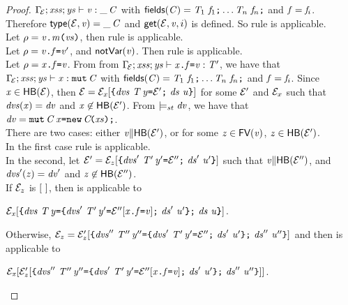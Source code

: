 {\begin{proof}
$\Gamma_{\!{\cal{E}}};\mathit{xss};\mathit{ys}\vdash {{\mathit{v}}}:\_\,\mathit{C}$ with 
$\textsf{fields}(\mathit{C})=\mathit{T}_1\ \mathit{f}_1\texttt{;}\ldots\mathit{T}_n\ \mathit{f}_n\texttt{;}$ and $\mathit{f}=\mathit{f}_i$.
Therefore $\textsf{type}({\cal{E}},\mathit{v})=\_\,\mathit{C}$ and $\textsf{get}({\cal{E}},\mathit{v},i)$ 
is defined. So rule 
is applicable.\\
Let \underline{${\rho}={\mathit{v}}\texttt{.}\mathit{m}\texttt{(}{\mathit{vs}}\texttt{)}$}, then rule 
is applicable.\\
Let \underline{${\rho}=\mathit{v}\texttt{.}\mathit{f}\texttt{=}\mathit{v}'$}, and ${\textsf{notVar}}(\mathit{v})$. Then rule  is applicable.\\
Let \underline{${\rho}=\mathit{x}\texttt{.}\mathit{f}\texttt{=}\mathit{v}$}. From from ${\Gamma_{\!{\cal{E}}}};\mathit{xss};\mathit{ys}\vdash {\mathit{x}\texttt{.}\mathit{f}\texttt{=}\mathit{v}}:\mathit{T}'$, we have that
${\Gamma_{\!{\cal{E}}}};\mathit{xss};\mathit{ys}\vdash \mathit{x}:\texttt{mut}\,\mathit{C}$ with
$\textsf{fields}(\mathit{C})=\mathit{T}_1\ \mathit{f}_1\texttt{;}\ldots\mathit{T}_n\ \mathit{f}_n\texttt{;}$ and $\mathit{f}=\mathit{f}_i$. Since $\mathit{x}\in\textsf{HB}({\cal{E}})$, 
then $\ctx=\DecEvCtx{\ctx}{\x}[\Block{\dvs\ \Dec{\T}{\y}{\ctxP}\ \decs}{\valPrime}]$ for some ${\cal{E}'}$ and ${\cal{E}}_x$ such that
$\mathit{dvs}(\mathit{x})=\mathit{dv}$ and $\mathit{x}\not\in\textsf{HB}({\cal{E}'})$. From $\models_{st}\mathit{dv}$, we have that $\mathit{dv}=\texttt{mut}\,\mathit{C}\,\mathit{x}\texttt{=}\texttt{new}\,\mathit{C}\!\texttt{(}{\mathit{xs}}\texttt{)}\texttt{;}$.\\
There are two cases: either $\mathit{v}{\parallel}\textsf{HB}({\cal{E}'})$, or for some $\mathit{z}\in\textsf{FV}(\mathit{v})$, $\mathit{z}\in\textsf{HB}({\cal{E}'})$.\\
In the first case rule  is applicable. \\
In the second, let $\ctxP={\ctx_z}[\Block{\dvs'\ \Dec{\T'}{\y'}{\ctx''}\ \decs'}{\valPrime'} ]$
such that $\mathit{v}{\parallel}\textsf{HB}({\cal{E}}'')$, and $\mathit{dvs}'(\mathit{z})=\mathit{dv}'$ and $\mathit{z}\not\in\textsf{HB}({\cal{E}}'')$. \\
If ${\cal{E}}_z$ is $[\ ]$, then  is applicable to
\begin{center}
$\DecEvCtx{\ctx}{\x}[\Block{\dvs\ \Dec{\T}{\y}{\Block{\dvs'\ \Dec{\T'}{\y'}{\ctx''[{\FieldAssign{\x}{\f}{\val}}]}\ \decs'}{\valPrime'}}\ \decs}{\valPrime}]$.
\end{center}
Otherwise,  $\ctx_z=\ctx'_z[\Block{\dvs''\ \Dec{\T''}{\y''}{\Block{\dvs'\ \Dec{\T'}{\y'}{\ctx''}\ \decs'}{\valPrime'}}\ \decs''}{\valPrime''}]$ and  
then  is applicable to
\begin{center}
$\DecEvCtx{\ctx}{\x}[\ctx'_z[\Block{\dvs''\ \Dec{\T''}{\y''}{\Block{\dvs'\ \Dec{\T'}{\y'}{\ctx''[{\FieldAssign{\x}{\f}{\val}}]}\ \decs'}{\valPrime'}}\ \decs''}{\valPrime''}]]$.
\end{center}

\end{proof}}

